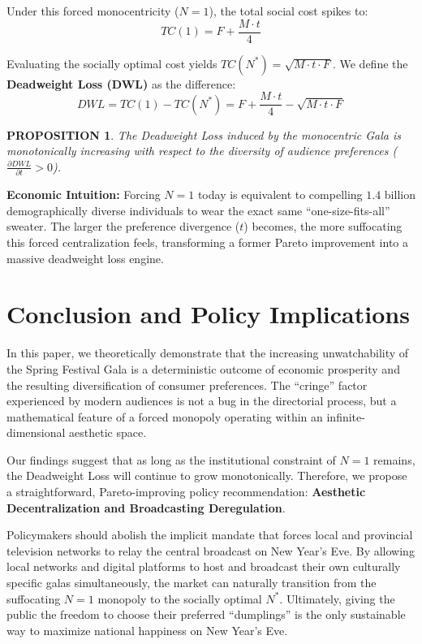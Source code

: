 \documentclass[AER]{AEA}
\DeclareRobustCommand{\AERlink}[1]{}
\newtheorem{proposition}{PROPOSITION}
\begin{document}
Under this forced monocentricity ($N = 1$), the total social cost spikes to:
\begin{equation}
    TC(1) = F + \frac{M \cdot t}{4}
\end{equation}

Evaluating the socially optimal cost yields $TC(N^*) = \sqrt{M \cdot t \cdot F}$. We define the \textbf{Deadweight Loss (DWL)} as the difference:
\begin{equation}
    DWL = TC(1) - TC(N^*) = F + \frac{M \cdot t}{4} - \sqrt{M \cdot t \cdot F}
\end{equation}

\begin{proposition}
The Deadweight Loss induced by the monocentric Gala is monotonically increasing with respect to the diversity of audience preferences ($\frac{\partial DWL}{\partial t} > 0$).
\end{proposition}

\noindent \textbf{Economic Intuition:} Forcing $N=1$ today is equivalent to compelling $1.4$ billion demographically diverse individuals to wear the exact same ``one-size-fits-all'' sweater. The larger the preference divergence ($t$) becomes, the more suffocating this forced centralization feels, transforming a former Pareto improvement into a massive deadweight loss engine.

\section{Conclusion and Policy Implications}

In this paper, we theoretically demonstrate that the increasing unwatchability of the Spring Festival Gala is a deterministic outcome of economic prosperity and the resulting diversification of consumer preferences. The ``cringe'' factor experienced by modern audiences is not a bug in the directorial process, but a mathematical feature of a forced monopoly operating within an infinite-dimensional aesthetic space.

Our findings suggest that as long as the institutional constraint of $N=1$ remains, the Deadweight Loss will continue to grow monotonically. Therefore, we propose a straightforward, Pareto-improving policy recommendation: \textbf{Aesthetic Decentralization and Broadcasting Deregulation}.

Policymakers should abolish the implicit mandate that forces local and provincial television networks to relay the central broadcast on New Year's Eve. By allowing local networks and digital platforms to host and broadcast their own culturally specific galas simultaneously, the market can naturally transition from the suffocating $N=1$ monopoly to the socially optimal $N^*$. Ultimately, giving the public the freedom to choose their preferred ``dumplings'' is the only sustainable way to maximize national happiness on New Year's Eve.

\FloatBarrier


\DeclareRobustCommand{\AERlink}[1]{\makebox[0pt][r]{\href{#1}{\color{blue}$\blacktriangleright$}\hspace{0.3em}}}



\end{document}
